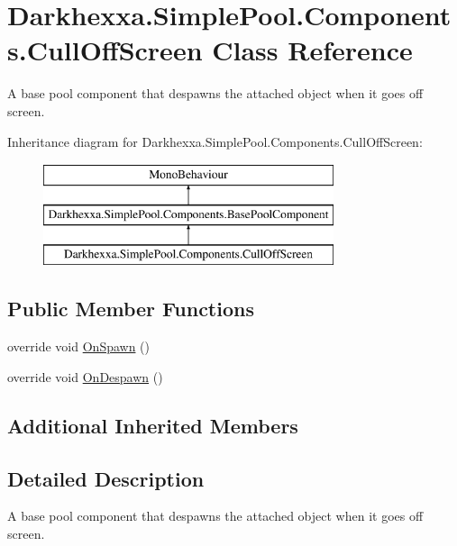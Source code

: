 \hypertarget{class_darkhexxa_1_1_simple_pool_1_1_components_1_1_cull_off_screen}{\section{Darkhexxa.\-Simple\-Pool.\-Components.\-Cull\-Off\-Screen Class Reference}
\label{class_darkhexxa_1_1_simple_pool_1_1_components_1_1_cull_off_screen}
}


A base pool component that despawns the attached object when it goes off screen.  


Inheritance diagram for Darkhexxa.\-Simple\-Pool.\-Components.\-Cull\-Off\-Screen\-:\begin{figure}[H]
\begin{center}
\leavevmode
\includegraphics[height=3.000000cm]{class_darkhexxa_1_1_simple_pool_1_1_components_1_1_cull_off_screen}
\end{center}
\end{figure}
\subsection*{Public Member Functions}
\begin{DoxyCompactItemize}
\item 
override void \hyperlink{class_darkhexxa_1_1_simple_pool_1_1_components_1_1_cull_off_screen_ad85eb1ac683e2368d1aa96c18bd9d317}{On\-Spawn} ()
\item 
override void \hyperlink{class_darkhexxa_1_1_simple_pool_1_1_components_1_1_cull_off_screen_a5f4a09e2cb31817af47ed394f4482bec}{On\-Despawn} ()
\end{DoxyCompactItemize}
\subsection*{Additional Inherited Members}


\subsection{Detailed Description}
A base pool component that despawns the attached object when it goes off screen. 

